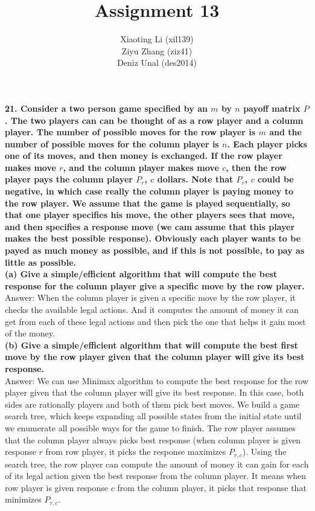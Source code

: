 \documentclass{article}
\title{Assignment 13}
\author{Xiaoting Li (xil139) \\
Ziyu Zhang (ziz41) \\
Deniz Unal (des2014)}
\date{}
\begin{document}
\maketitle
\noindent
\textbf{21. Consider a two person game specified by an $m$ by $n$ payoff matrix $P$. The two players can can be thought of as a row player and a column player. The number of possible moves for the row player is $m$ and the number of possible moves for the column player is $n$. Each player picks one of its moves, and then money is exchanged. If the row player makes move $r$, and the column player makes move $c$, then the row player pays the column player $P_r$, $c$ dollars. Note that $P_r$, $c$ could be negative, in which case really the column player is paying money to the row player. We assume that the game is played sequentially, so that one player specifies his move, the other players sees that move, and then specifies a response move (we cam assume that this player makes the best possible response). Obviously each player wants to be payed as much money as possible, and if this is not possible, to pay as little as possible.} \\ \newline
\textbf{(a) Give a simple/efficient algorithm that will compute the best response for the column player give a specific move by the row player.} \\ \newline
Answer: When the column player is given a specific move by the row player, it checks the available legal actions. And it computes the amount of money it can get from each of these legal actions and then pick the one that helps it gain most of the money.\\ \newline
\textbf{(b) Give a simple/efficient algorithm that will compute the best first move by the row player given that the column player will give its best response.} \\ \newline
Answer: We can use Minimax algorithm to compute the best response for the row player given that the column player will give its best response. In this case, both sides are rationally players and both of them pick best moves. We build a game search tree, which keeps expanding all possible states from the initial state until we enumerate all possible ways for the game to finish. The row player assumes that the column player always picks best response (when column player is given response $r$ from row player, it picks the response maximizes $P_{r,c}$). Using the search tree, the row player can compute the amount of money it can gain for each of its legal action given the best response from the column player. It means when row player is given response $c$ from the column player, it picks that response that minimizes $P_{r,c}$.\\ \newline
\end{document}
